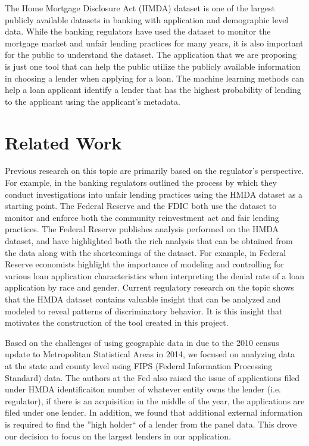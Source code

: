 \documentclass[conference,compsoc]{IEEEtran}
\begin{document}
The Home Mortgage Disclosure Act (HMDA) dataset is one of the largest publicly available datasets in banking with application and demographic level data.  While the banking regulators have used the dataset to monitor the mortgage market and unfair lending practices for many years, it is also important for the public to understand the dataset.  The application that we are proposing is just one tool that can help the public utilize the publicly available information in choosing a lender when applying for a loan.  The machine learning methods can help a loan applicant identify a lender that has the highest probability of lending to the applicant using the applicant’s metadata.  


\section{Related Work}

Previous research on this topic are primarily based on the regulator’s perspective.  For example, in \cite{FDIC} the banking regulators outlined the process by which they conduct investigations into unfair lending practices using the HMDA dataset as a starting point.  The Federal Reserve and the FDIC both use the dataset to monitor and enforce both the community reinvestment act and fair lending practices. 
The Federal Reserve publishes analysis performed on the HMDA dataset, and have highlighted both the rich analysis that can be obtained from the data along with the shortcomings of the dataset.  For example, in \cite{FED} Federal Reserve economists highlight the importance of modeling and controlling for various loan application characteristics when interpreting the denial rate of a loan application by race and gender. 
Current regulatory research on the topic shows that the HMDA dataset contains valuable insight that can be analyzed and modeled to reveal patterns of discriminatory behavior. It is this insight that motivates the construction of the tool created in this project.

Based on the challenges of using geographic data in \cite{FED} due to the 2010 census update to Metropolitan Statistical Areas in 2014, we focused on analyzing data at the state and county level using FIPS (Federal Information Processing Standard) data.  The authors at the Fed \cite{FED} also raised the issue of applications filed under HMDA identificaiton number of whatever entity owns the lender (i.e. regulator), if there is an acquisition in the middle of the year, the applications are filed under one lender.  In addition, we found that additional external information is required to find the ''high holder`` of a lender from the panel data.  This drove our decision to focus on the largest lenders in our application.  
\end{document}
